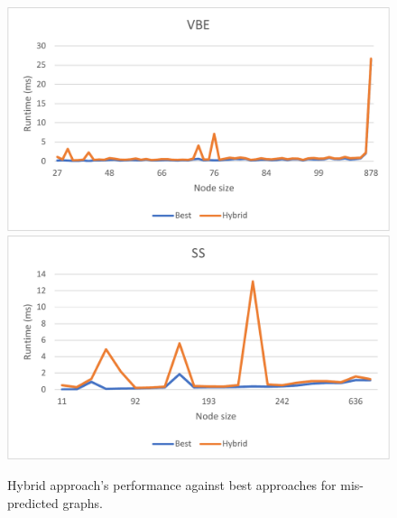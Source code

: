 \begin{figure}[h]
\label{fig:mis-rs}
\includegraphics[width=0.32\linewidth]{tex-figures/misprediction/VBE-crop.pdf}
\label{fig:mis-vbe}
\\
	\includegraphics[width=0.32\linewidth]{tex-figures/misprediction/SS-crop.pdf}
	\label{fig:mis-ss}
\caption{Hybrid approach's performance against best approaches for mis-predicted graphs.}
\label{fig:mis-graph}
\end{figure}

